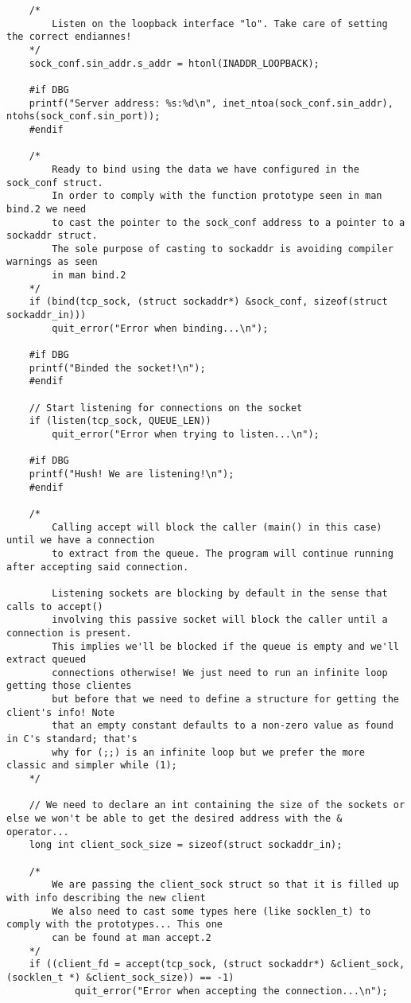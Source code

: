 \documentclass[landscape]{article}
\begin{document}
\begin{verbatim}
    /*
        Listen on the loopback interface "lo". Take care of setting the correct endiannes!
    */
    sock_conf.sin_addr.s_addr = htonl(INADDR_LOOPBACK);

    #if DBG
    printf("Server address: %s:%d\n", inet_ntoa(sock_conf.sin_addr), ntohs(sock_conf.sin_port));
    #endif

    /*
        Ready to bind using the data we have configured in the sock_conf struct.
        In order to comply with the function prototype seen in man bind.2 we need
        to cast the pointer to the sock_conf address to a pointer to a sockaddr struct.
        The sole purpose of casting to sockaddr is avoiding compiler warnings as seen
        in man bind.2
    */
    if (bind(tcp_sock, (struct sockaddr*) &sock_conf, sizeof(struct sockaddr_in)))
        quit_error("Error when binding...\n");

    #if DBG
    printf("Binded the socket!\n");
    #endif

    // Start listening for connections on the socket
    if (listen(tcp_sock, QUEUE_LEN))
        quit_error("Error when trying to listen...\n");

    #if DBG
    printf("Hush! We are listening!\n");
    #endif

    /*
        Calling accept will block the caller (main() in this case) until we have a connection
        to extract from the queue. The program will continue running after accepting said connection.

        Listening sockets are blocking by default in the sense that calls to accept()
        involving this passive socket will block the caller until a connection is present.
        This implies we'll be blocked if the queue is empty and we'll extract queued
        connections otherwise! We just need to run an infinite loop getting those clientes
        but before that we need to define a structure for getting the client's info! Note
        that an empty constant defaults to a non-zero value as found in C's standard; that's
        why for (;;) is an infinite loop but we prefer the more classic and simpler while (1);
    */

    // We need to declare an int containing the size of the sockets or else we won't be able to get the desired address with the & operator...
    long int client_sock_size = sizeof(struct sockaddr_in);

    /*
        We are passing the client_sock struct so that it is filled up with info describing the new client
        We also need to cast some types here (like socklen_t) to comply with the prototypes... This one
        can be found at man accept.2
    */
    if ((client_fd = accept(tcp_sock, (struct sockaddr*) &client_sock, (socklen_t *) &client_sock_size)) == -1)
            quit_error("Error when accepting the connection...\n");


\end{verbatim}
\end{document}
